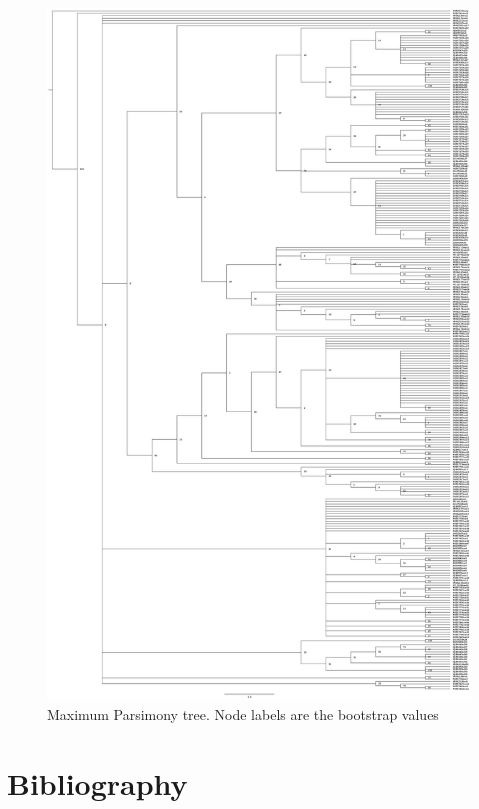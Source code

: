 \begin{figure}[htbp]
\centering
\includegraphics[keepaspectratio,width=\textwidth,height=0.75\textheight]{images/mp.jpg}
\caption{Maximum Parsimony tree. Node labels are the bootstrap values}
\end{figure}

\part{Bibliography}
\label{bibliography}




